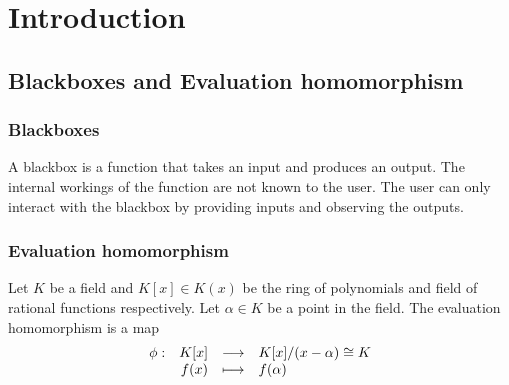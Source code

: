 \chapter{Introduction}
\section{Blackboxes and Evaluation homomorphism}
\subsection{Blackboxes}
\begin{definition}
A blackbox is a function that takes an input and produces an output. The internal workings of the function are not known
 to the user. The user can only interact with the blackbox by providing inputs and observing the outputs.
\end{definition}
\subsection{Evaluation homomorphism}
\begin{definition}
Let $K$ be a field and $K[x] \in K(x)$ be the ring of polynomials and field of rational functions respectively.
Let $\alpha \in K$ be a point in the field. The evaluation homomorphism is a map
\[
\begin{array}{c r l l }
\phi: & K[x] & \longrightarrow & K[x]/(x-\alpha) \cong K \\
& f(x) & \longmapsto & f(\alpha)
\end{array}
\]
\end{definition}    
